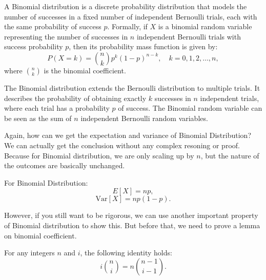 \begin{definition}
    A Binomial distribution is a discrete probability distribution that models the number of successes in a fixed number of independent Bernoulli trials, each with the same probability of success \( p \). Formally, if \( X \) is a binomial random variable representing the number of successes in \( n \) independent Bernoulli trials with success probability \( p \), then its probability mass function is given by:
    \[
    P(X = k) = \binom{n}{k} p^k (1-p)^{n-k}, \quad k = 0, 1, 2, \ldots, n,
    \]
    where \( \binom{n}{k} \) is the binomial coefficient.
\end{definition}

    The Binomial distribution extends the Bernoulli distribution to multiple trials. It describes the probability of obtaining exactly \( k \) successes in \( n \) independent trials, where each trial has a probability \( p \) of success. The Binomial random variable can be seen as the sum of \( n \) independent Bernoulli random variables.

    Again, how can we get the expectation and variance of Binomial Distribution? We can actually get the conclusion without any complex resoning or proof. Because for Binomial distribution, we are only scaling up by $n$, but the nature of the outcomes are basically unchanged.

    For Binomial Distribution:
    \begin{equation}
    E[X] =  np,
\end{equation}
\begin{equation}
    \text{Var}[X] = np(1-p).
\end{equation}

However, if you still want to be rigorous, we can use another important property of Binomial distribution to show this. But before that, we need to prove a lemma on binomial coefficient.

\begin{lemma}
    For any integers \( n \) and \( i \), the following identity holds:
    \[
    i \binom{n}{i} = n \binom{n-1}{i-1}.
    \]
\end{lemma}


